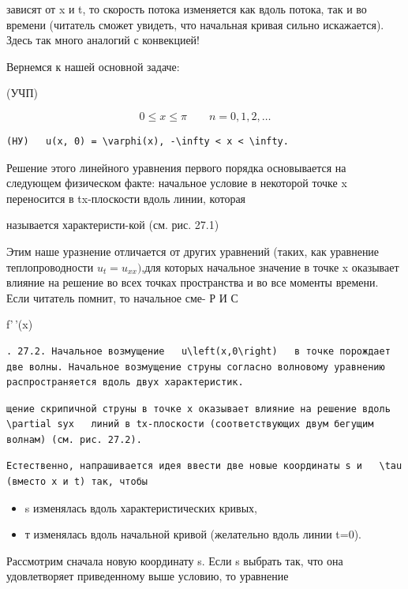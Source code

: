 \documentclass[
  ukrainian,
]{article}
\begin{document}
зависят от x и t, то скорость потока изменяется как вдоль потока, так и
во времени (читатель сможет увидеть, что начальная кривая сильно
искажается). Здесь так много аналогий с конвекцией!

Вернемся к нашей основной задаче:

(УЧП)

\[
0 \le x \le \pi \qquad n = 0, 1, 2, \dots
\]

\begin{verbatim}
(НУ)   u(x, 0) = \varphi(x), -\infty < x < \infty.
\end{verbatim}

Решение этого линейного уравнения первого порядка основывается на
следующем физическом факте: начальное условие в некоторой точке x
переносится в tx-плоскости вдоль линии, которая

называется характеристи-кой (см. рис. 27.1)

Этим наше уразнение отличается от других уравнений (таких, как уравнение
теплопроводности \(u_t = u_{xx} )\),для которых начальное значение в
точке x оказывает влияние на решение во всех точках пространства и во
все моменты времени. Если читатель помнит, то начальное сме- Р И С

f'\,'(x)

\begin{verbatim}
. 27.2. Начальное возмущение   u\left(x,0\right)   в точке порождает две волны. Начальное возмущение струны согласно волновому уравнению распространяется вдоль двух характеристик.
\end{verbatim}

\begin{verbatim}
щение скрипичной струны в точке x оказывает влияние на решение вдоль   \partial syx   линий в tx-плоскости (соответствующих двум бегущим волнам) (см. рис. 27.2).
\end{verbatim}

\begin{verbatim}
Естественно, напрашивается идея ввести две новые координаты s и   \tau   (вместо x и t) так, чтобы
\end{verbatim}

\begin{itemize}
\item
  s изменялась вдоль характеристических кривых,
\item
  т изменялась вдоль начальной кривой (желательно вдоль линии t=0).
\end{itemize}

Рассмотрим сначала новую координату s. Если s выбрать так, что она
удовлетворяет приведенному выше условию, то уравнение
\end{document}
